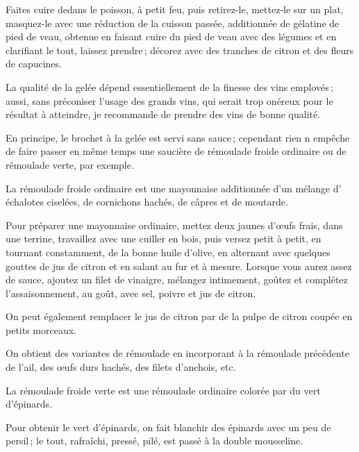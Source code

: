 Faites cuire dedans le poisson, à petit feu, puis retirez-le, mettez-le sur un
plat, masquez-le avec une réduction de la cuisson passée, additionnée de
gélatine de pied de veau, obtenue en faisant cuire du pied de veau avec des
légumes et en clarifiant le tout, laissez prendre ; décorez avec des tranches
de citron et des fleurs de capucines.

La qualité de la gelée dépend essentiellement de la finesse des vins emplovés ;
aussi, sans préconiser l'usage des grands vins, qui serait trop onéreux pour le
résultat à atteindre, je recommande de prendre des vins de bonne qualité.

En principe, le brochet à la gelée est servi sans sauce ; cependant rien
n empêche de faire passer en même temps une saucière de rémoulade froide
ordinaire ou de rémoulade verte, par exemple.

\sk

La rémoulade froide ordinaire est une mayonnaise additionnée d'un mélange
d' échalotes ciselées, de cornichons hachés, de câpres et de moutarde.

\label{pg0323-2} \hypertarget{p0323-2}{}
Pour préparer une mayonnaise ordinaire, mettez deux jaunes d'œufs frais, dans
une terrine, travaillez avec une cuiller en bois, puis versez petit à petit, en
tournant constamment, de la bonne huile d'olive, en alternant avec quelques
gouttes de jus de citron et en salant au fur et à mesure. Lorsque vous aurez
assez de sauce, ajoutez un filet de vinaigre, mélangez intimement, goûtez et
complétez l'assaisonnement, au goût, avec sel, poivre et jus de citron.

On peut également remplacer le jus de citron par de la pulpe de citron coupée
en petits morceaux.

\sk

On obtient des variantes de rémoulade en incorporant à la rémoulade précédente
de l'ail, des œufs durs hachés, des filets d'anchois, etc.

\sk

La rémoulade froide verte est une rémoulade ordinaire colorée par du vert
d'épinards.

\label{pg0324} \hypertarget{p0324}{}
Pour obtenir le vert d'épinards, on fait blanchir des épinards avec un peu de
persil ; le tout, rafraîchi, pressé, pilé, est passé à la double mousseline.

\sk


